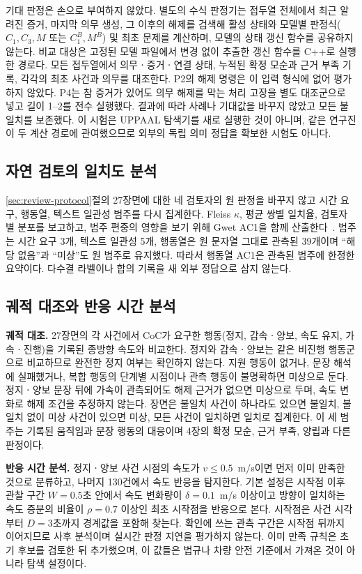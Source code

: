 \begin{revision}
기대 판정은 손으로 부여하지 않았다. 별도의 수식 판정기는 접두열 전체에서 최근 알려진 증거, 마지막 의무 생성, 그 이후의 해제를 검색해 활성 상태와 모델별 판정식($C_1,C_3,M$ 또는 $C_1^B,M^B$) 및 최초 문제를 계산하며, 모델의 상태 갱신 함수를 공유하지 않는다. 비교 대상은 고정된 모델 파일에서 변경 없이 추출한 갱신 함수를 C++로 실행한 경로다. 모든 접두열에서 의무ㆍ증거ㆍ연결 상태, 누적된 확정 모순과 근거 부족 기록, 각각의 최초 사건과 의무를 대조한다. P2의 해제 명령은 이 입력 형식에 없어 평가하지 않았다. P4는 참 증거가 있어도 의무 해제를 막는 처리 고장을 별도 대조군으로 넣고 길이 1--2를 전수 실행했다. 결과에 따라 사례나 기대값을 바꾸지 않았고 모든 불일치를 보존했다. 이 시험은 UPPAAL 탐색기를 새로 실행한 것이 아니며, 같은 연구진이 두 계산 경로에 관여했으므로 외부의 독립 의미 정답을 확보한 시험도 아니다.

\subsection{자연 검토의 일치도 분석}
\label{sec:human-design}
\ref{sec:review-protocol}절의 27장면에 대한 네 검토자의 원 판정을 바꾸지 않고 시간 요구, 행동열, 텍스트 일관성 범주를 다시 집계한다. Fleiss $\kappa$, 평균 쌍별 일치율, 검토자별 분포를 보고하고, 범주 편중의 영향을 보기 위해 Gwet AC1을 함께 산출한다~\cite{gwet2008agreement}. 범주는 시간 요구 3개, 텍스트 일관성 5개, 행동열은 원 문자열 그대로 관측된 39개이며 ``해당 없음''과 ``미상''도 원 범주로 유지했다. 따라서 행동열 AC1은 관측된 범주에 한정한 요약이다. 다수결 라벨이나 합의 기록을 새 외부 정답으로 삼지 않는다.

\subsection{궤적 대조와 반응 시간 분석}
\label{sec:aux-design}
\textbf{궤적 대조.} 27장면의 각 사건에서 CoC가 요구한 행동(정지, 감속ㆍ양보, 속도 유지, 가속ㆍ진행)을 기록된 종방향 속도와 비교한다. 정지와 감속ㆍ양보는 같은 비진행 행동군으로 비교하므로 완전한 정지 여부는 확인하지 않는다. 지원 행동이 없거나, 문장 해석에 실패했거나, 복합 행동의 단계별 시점이나 관측 행동이 불명확하면 미상으로 둔다. 정지ㆍ양보 문장 뒤에 가속이 관측되어도 해제 근거가 없으면 미상으로 두며, 속도 변화로 해제 조건을 추정하지 않는다. 장면은 불일치 사건이 하나라도 있으면 불일치, 불일치 없이 미상 사건이 있으면 미상, 모든 사건이 일치하면 일치로 집계한다. 이 세 범주는 기록된 움직임과 문장 행동의 대응이며 4장의 확정 모순, 근거 부족, 양립과 다른 판정이다.

\textbf{반응 시간 분석.} 정지ㆍ양보 사건 시점의 속도가 $v\leq0.5$~m/s이면 먼저 이미 만족한 것으로 분류하고, 나머지 130건에서 속도 반응을 탐지한다. 기본 설정은 시작점 이후 관찰 구간 $W=0.5$초 안에서 속도 변화량이 $\delta=0.1$~m/s 이상이고 방향이 일치하는 속도 증분의 비율이 $\rho=0.7$ 이상인 최초 시작점을 반응으로 본다. 시작점은 사건 시각부터 $D=3$초까지 경계값을 포함해 찾는다. 확인에 쓰는 관측 구간은 시작점 뒤까지 이어지므로 사후 분석이며 실시간 판정 지연을 평가하지 않는다. 이미 만족 규칙은 초기 후보를 검토한 뒤 추가했으며, 이 값들은 법규나 차량 안전 기준에서 가져온 것이 아니라 탐색 설정이다.


\end{revision}
